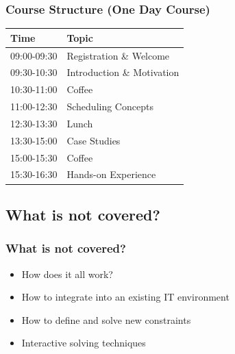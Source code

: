 
\begin{frame}
\frametitle{Course Structure (One Day Course)}
\begin{tabular}{lp{9cm}}\toprule
Time & Topic \\\midrule
09:00-09:30 & Registration \& Welcome \\
09:30-10:30 & Introduction \& Motivation\\
10:30-11:00 & Coffee \\
11:00-12:30 & Scheduling Concepts\\
12:30-13:30 & Lunch\\
13:30-15:00 & Case Studies\\
15:00-15:30 & Coffee \\
15:30-16:30 & Hands-on Experience\\
\bottomrule
\end{tabular}
\end{frame}


\subsection{What is not covered?}

\begin{frame}
\frametitle{What is not covered?}
\begin{itemize}
\item How does it all work?
\item How to integrate into an existing IT environment
\item How to define and solve new constraints
\item Interactive solving techniques 
\end{itemize}
\end{frame}

